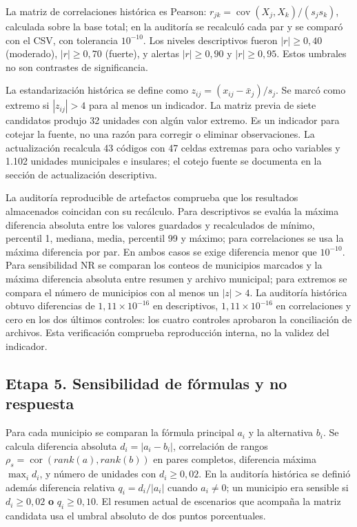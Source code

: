 La matriz de correlaciones histórica es Pearson: $r_{jk}=\operatorname{cov}(X_j,X_k)/(s_js_k)$, calculada sobre la base total; en la auditoría se recalculó cada par y se comparó con el CSV, con tolerancia $10^{-10}$. Los niveles descriptivos fueron $|r|\geq0,40$ (moderado), $|r|\geq0,70$ (fuerte), y alertas $|r|\geq0,90$ y $|r|\geq0,95$. Estos umbrales no son contrastes de significancia.

La estandarización histórica se define como $z_{ij}=(x_{ij}-\bar{x}_j)/s_j$. Se marcó como extremo si $|z_{ij}|>4$ para al menos un indicador. La matriz previa de siete candidatos produjo 32 unidades con algún valor extremo. Es un indicador para cotejar la fuente, no una razón para corregir o eliminar observaciones. La actualización recalcula 43 códigos con 47 celdas extremas para ocho variables y 1.102 unidades municipales e insulares; el cotejo fuente se documenta en la sección de actualización descriptiva.

La auditoría reproducible de artefactos comprueba que los resultados almacenados coincidan con su recálculo. Para descriptivos se evalúa la máxima diferencia absoluta entre los valores guardados y recalculados de mínimo, percentil 1, mediana, media, percentil 99 y máximo; para correlaciones se usa la máxima diferencia por par. En ambos casos se exige diferencia menor que $10^{-10}$. Para sensibilidad NR se comparan los conteos de municipios marcados y la máxima diferencia absoluta entre resumen y archivo municipal; para extremos se compara el número de municipios con al menos un $|z|>4$. La auditoría histórica obtuvo diferencias de $1,11\times10^{-16}$ en descriptivos, $1,11\times10^{-16}$ en correlaciones y cero en los dos últimos controles: los cuatro controles aprobaron la conciliación de archivos. Esta verificación comprueba reproducción interna, no la validez del indicador.

\subsection{Etapa 5. Sensibilidad de fórmulas y no respuesta}

Para cada municipio se comparan la fórmula principal $a_i$ y la alternativa $b_i$. Se calcula diferencia absoluta $d_i=|a_i-b_i|$, correlación de rangos $\rho_s=\operatorname{cor}(rank(a),rank(b))$ en pares completos, diferencia máxima $\max_i d_i$, y número de unidades con $d_i\geq0,02$. En la auditoría histórica se definió además diferencia relativa $q_i=d_i/|a_i|$ cuando $a_i\ne0$; un municipio era sensible si $d_i\geq0,02$ \textbf{o} $q_i\geq0,10$. El resumen actual de escenarios que acompaña la matriz candidata usa el umbral absoluto de dos puntos porcentuales.

